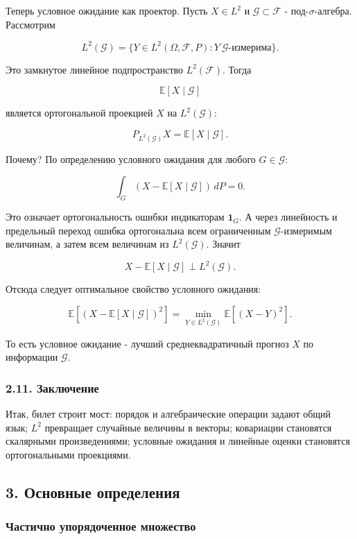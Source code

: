 \documentclass[
  11pt,
  a4paper,
]{article}
\begin{document}
Теперь условное ожидание как проектор. Пусть \(X\in L^2\) и
\(\mathcal G\subset\mathcal F\) - под-\(\sigma\)-алгебра. Рассмотрим

\[
L^2(\mathcal G)
=
\{Y\in L^2(\Omega,\mathcal F,P):Y\ \mathcal G\text{-измерима}\}.
\]

Это замкнутое линейное подпространство \(L^2(\mathcal F)\). Тогда

\[
\mathbb E[X\mid\mathcal G]
\]

является ортогональной проекцией \(X\) на \(L^2(\mathcal G)\):

\[
P_{L^2(\mathcal G)}X=\mathbb E[X\mid\mathcal G].
\]

Почему? По определению условного ожидания для любого \(G\in\mathcal G\):

\[
\int_G(X-\mathbb E[X\mid\mathcal G])\,dP=0.
\]

Это означает ортогональность ошибки индикаторам \(\mathbf 1_G\). А через
линейность и предельный переход ошибка ортогональна всем ограниченным
\(\mathcal G\)-измеримым величинам, а затем всем величинам из
\(L^2(\mathcal G)\). Значит

\[
X-\mathbb E[X\mid\mathcal G]\perp L^2(\mathcal G).
\]

Отсюда следует оптимальное свойство условного ожидания:

\[
\mathbb E[(X-\mathbb E[X\mid\mathcal G])^2]
=
\min_{Y\in L^2(\mathcal G)}
\mathbb E[(X-Y)^2].
\]

То есть условное ожидание - лучший среднеквадратичный прогноз \(X\) по
информации \(\mathcal G\).

\subsubsection{2.11.
Заключение}\label{ux437ux430ux43aux43bux44eux447ux435ux43dux438ux435}

Итак, билет строит мост: порядок и алгебраические операции задают общий
язык; \(L^2\) превращает случайные величины в векторы; ковариации
становятся скалярными произведениями; условные ожидания и линейные
оценки становятся ортогональными проекциями.

\subsection{3. Основные
определения}\label{ux43eux441ux43dux43eux432ux43dux44bux435-ux43eux43fux440ux435ux434ux435ux43bux435ux43dux438ux44f}

\subsubsection{Частично упорядоченное
множество}\label{ux447ux430ux441ux442ux438ux447ux43dux43e-ux443ux43fux43eux440ux44fux434ux43eux447ux435ux43dux43dux43eux435-ux43cux43dux43eux436ux435ux441ux442ux432ux43e}
\end{document}
